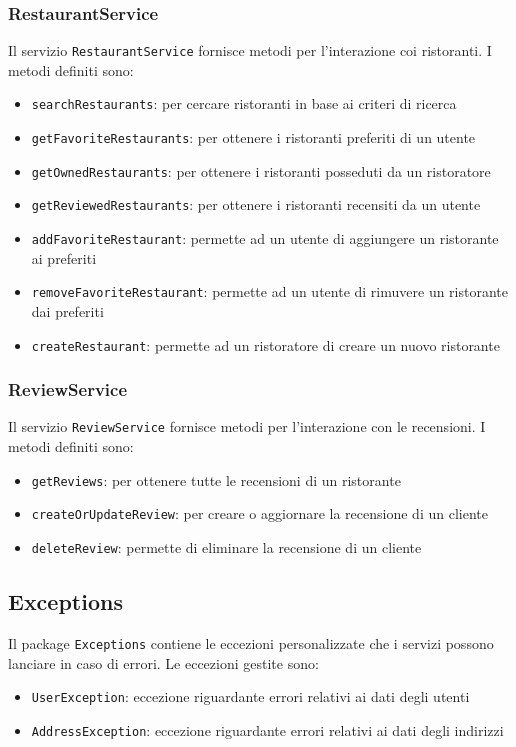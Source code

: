 \subsubsection{RestaurantService}
\label{sec:restaurantservice}
Il servizio \texttt{RestaurantService} fornisce metodi per 
l'interazione coi ristoranti.
I metodi definiti sono:
\begin{itemize}
    \item \texttt{searchRestaurants}: per cercare ristoranti in base ai criteri di ricerca
    \item \texttt{getFavoriteRestaurants}: per ottenere i ristoranti preferiti di un utente
    \item \texttt{getOwnedRestaurants}: per ottenere i ristoranti posseduti da un ristoratore
    \item \texttt{getReviewedRestaurants}: per ottenere i ristoranti recensiti da un utente
    \item \texttt{addFavoriteRestaurant}: permette ad un utente di aggiungere un ristorante ai preferiti
    \item \texttt{removeFavoriteRestaurant}: permette ad un utente di rimuvere un ristorante dai preferiti
    \item \texttt{createRestaurant}: permette ad un ristoratore di creare un nuovo ristorante
\end{itemize}

\subsubsection{ReviewService}
\label{sec:reviewservice}
Il servizio \texttt{ReviewService} fornisce metodi per 
l'interazione con le recensioni.
I metodi definiti sono:
\begin{itemize}
    \item \texttt{getReviews}: per ottenere tutte le recensioni di un ristorante
    \item \texttt{createOrUpdateReview}: per creare o aggiornare la recensione di un cliente
    \item \texttt{deleteReview}: permette di eliminare la recensione di un cliente
\end{itemize}

\subsection{Exceptions}
Il package \texttt{Exceptions} contiene le eccezioni personalizzate 
che i servizi possono lanciare in caso di errori.
Le eccezioni gestite sono:
\begin{itemize}
    \item \texttt{UserException}: eccezione riguardante errori relativi ai dati degli utenti
    \item \texttt{AddressException}: eccezione riguardante errori relativi ai dati degli indirizzi
\end{itemize}
